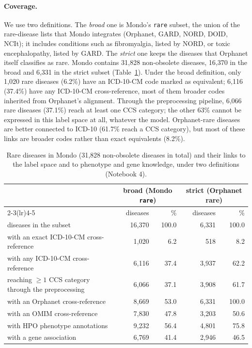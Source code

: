 \documentclass[11pt]{article}
\begin{document}
\paragraph{Coverage.} We use two definitions. The \emph{broad} one is Mondo's \texttt{rare} subset, the union of
the rare-disease lists that Mondo integrates (Orphanet, GARD, NORD, DOID, NCIt); it includes conditions such
as fibromyalgia, listed by NORD, or toxic encephalopathy, listed by GARD. The \emph{strict} one keeps the
diseases that Orphanet itself classifies as rare. Mondo contains 31,828 non-obsolete diseases, 16,370 in the
broad and 6,331 in the strict subset (Table~\ref{tab:coverage}). Under the broad definition, only 1,020 rare diseases (6.2\%) have an ICD-10-CM code marked as equivalent;
6,116 (37.4\%) have any ICD-10-CM cross-reference, most of them broader codes inherited from Orphanet's
alignment. Through the preprocessing pipeline, 6,066 rare diseases (37.1\%) reach at least one CCS category; the
other 63\% cannot be expressed in this label space at all, whatever the model. Orphanet-rare diseases are better
connected to ICD-10 (61.7\% reach a CCS category), but most of these links are broader codes rather than exact
equivalents (8.2\%).

\begin{table}[H]
\centering\small
\begin{tabular}{lrrrr}
\toprule
 & \multicolumn{2}{c}{broad (Mondo \texttt{rare})} & \multicolumn{2}{c}{strict (Orphanet rare)}\\
\cmidrule(lr){2-3}\cmidrule(lr){4-5}
 & diseases & \% & diseases & \%\\
\midrule
diseases in the subset & 16,370 & 100.0 & 6,331 & 100.0\\
with an exact ICD-10-CM cross-reference & 1,020 & 6.2 & 518 & 8.2\\
with any ICD-10-CM cross-reference & 6,116 & 37.4 & 3,937 & 62.2\\
reaching $\ge 1$ CCS category through the preprocessing & 6,066 & 37.1 & 3,908 & 61.7\\
with an Orphanet cross-reference & 8,669 & 53.0 & 6,331 & 100.0\\
with an OMIM cross-reference & 7,830 & 47.8 & 3,203 & 50.6\\
with HPO phenotype annotations & 9,232 & 56.4 & 4,801 & 75.8\\
with a gene association & 6,769 & 41.4 & 2,946 & 46.5\\
\bottomrule
\end{tabular}
\caption{Rare diseases in Mondo (31,828 non-obsolete diseases in total) and their links to the label space and
to phenotype and gene knowledge, under two definitions (Notebook 4).}
\label{tab:coverage}
\end{table}
\end{document}
